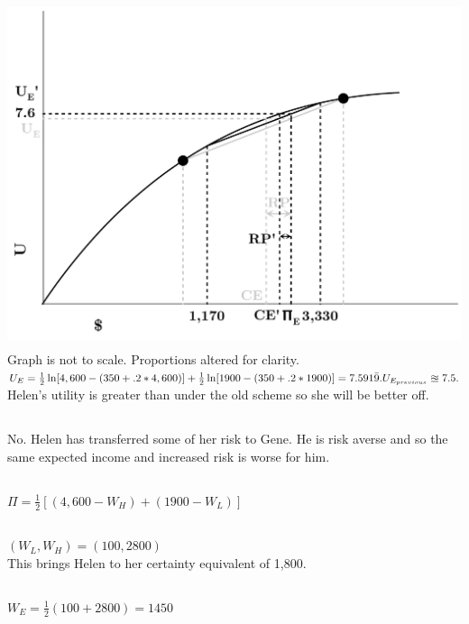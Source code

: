\documentclass{article}
\begin{document}
	\subsection[f]{}
		\includegraphics[height=4in]{Charts/3f}
		 \\Graph is not to scale. Proportions altered for clarity. \\
		$U_E = \frac{1}{2}\ln[4,600-(350+.2*4,600)] + \frac{1}{2}\ln[1900-(350+.2*1900)] = 7.591\bar{9}. \\
		U_{E_{previous}} \approxeq 7.5.$ \\
		Helen's utility is greater than under the old scheme so she will be better off. 
	\subsection[g]{}
		No. Helen has transferred some of her risk to Gene. He is risk averse and so the same expected income and increased risk is worse for him. 
	\subsection[h]{}
		$ \Pi = \frac{1}{2}[(4,600-W_H)+(1900-W_L)] $
	\subsection[i]{}
		$ (W_L, W_H) = (100,2800) $ \\
		This brings Helen to her certainty equivalent of 1,800. 
	\subsection[j]{}
		$ W_E = \frac{1}{2}(100+2800) = 1450 $
\end{document}
